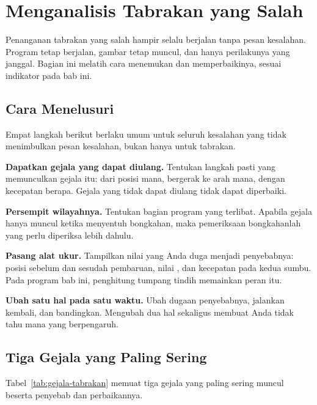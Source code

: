 \section{Menganalisis Tabrakan yang Salah}
\label{sec:analisis-tabrakan}

Penanganan tabrakan yang salah hampir selalu berjalan tanpa pesan kesalahan.
Program tetap berjalan, gambar tetap muncul, dan hanya perilakunya yang janggal.
Bagian ini melatih cara menemukan dan memperbaikinya, sesuai indikator 
pada bab ini.

\subsection{Cara Menelusuri}

Empat langkah berikut berlaku umum untuk seluruh kesalahan yang tidak
menimbulkan pesan kesalahan, bukan hanya untuk tabrakan.

\begin{langkah}
  \item \textbf{Dapatkan gejala yang dapat diulang.} Tentukan langkah pasti yang
        memunculkan gejala itu: dari posisi mana, bergerak ke arah mana, dengan
        kecepatan berapa. Gejala yang tidak dapat diulang tidak dapat
        diperbaiki.
  \item \textbf{Persempit wilayahnya.} Tentukan bagian program yang terlibat.
        Apabila gejala hanya muncul ketika menyentuh bongkahan, maka
        pemeriksaan bongkahanlah yang perlu diperiksa lebih dahulu.
  \item \textbf{Pasang alat ukur.} Tampilkan nilai yang Anda duga menjadi
        penyebabnya: posisi sebelum dan sesudah pembaruan, nilai ,
        dan kecepatan pada kedua sumbu. Pada program bab ini, penghitung
        tumpang tindih memainkan peran itu.
  \item \textbf{Ubah satu hal pada satu waktu.} Ubah dugaan penyebabnya, jalankan
        kembali, dan bandingkan. Mengubah dua hal sekaligus membuat Anda tidak
        tahu mana yang berpengaruh.
\end{langkah}

\subsection{Tiga Gejala yang Paling Sering}

Tabel~\ref{tab:gejala-tabrakan} memuat tiga gejala yang paling sering muncul
beserta penyebab dan perbaikannya.

